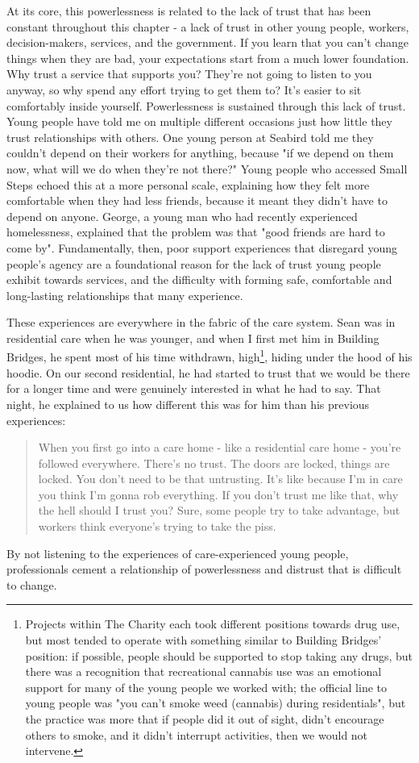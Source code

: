 At its core, this powerlessness is related to the lack of trust that has been constant throughout this chapter - a lack of trust in other young people, workers, decision-makers, services, and the government. If you learn that you can't change things when they are bad, your expectations start from a much lower foundation. Why trust a service that supports you? They're not going to listen to you anyway, so why spend any effort trying to get them to? It's easier to sit comfortably inside yourself. Powerlessness is sustained through this lack of trust. Young people have told me on multiple different occasions just how little they trust relationships with others. One young person at Seabird told me they couldn't depend on their workers for anything, because "if we depend on them now, what will we do when they're not there?" Young people who accessed Small Steps echoed this at a more personal scale, explaining how they felt more comfortable when they had less friends, because it meant they didn't have to depend on anyone. George, a young man who had recently experienced homelessness, explained that the problem was that "good friends are hard to come by". Fundamentally, then, poor support experiences that disregard young people’s agency are a foundational reason for the lack of trust young people exhibit towards services, and the difficulty with forming safe, comfortable and long-lasting relationships that many experience. 

These experiences are everywhere in the fabric of the care system. Sean was in residential care when he was younger, and when I first met him in Building Bridges, he spent most of his time withdrawn, high\footnote{Projects within The Charity each took different positions towards drug use, but most tended to operate with something similar to Building Bridges’ position: if possible, people should be supported to stop taking any drugs, but there was a recognition that recreational cannabis use was an emotional support for many of the young people we worked with; the official line to young people was "you can’t smoke weed (cannabis) during residentials", but the practice was more that if people did it out of sight, didn’t encourage others to smoke, and it didn’t interrupt activities, then we would not intervene.},  hiding under the hood of his hoodie. On our second residential, he had started to trust that we would be there for a longer time and were genuinely interested in what he had to say. That night, he explained to us how different this was for him than his previous experiences:
\begin{quote}
When you first go into a care home - like a residential care home - you're followed everywhere. There's no trust. The doors are locked, things are locked. You don't need to be that untrusting. It's like because I'm in care you think I'm gonna rob everything. If you don't trust me like that, why the hell should I trust you? Sure, some people try to take advantage, but workers think everyone's trying to take the piss.
\end{quote}
By not listening to the experiences of care-experienced young people, professionals cement a relationship of powerlessness and distrust that is difficult to change.

